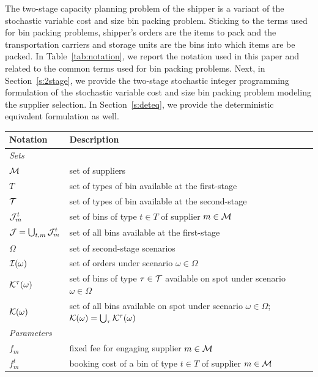 \documentclass[a4paper,11pt]{article}
\begin{document}
	The two-stage capacity planning problem of the shipper is a variant of the stochastic variable cost and size bin packing problem.
	Sticking to the terms used for bin packing problems, shipper's orders are the items to pack and the transportation carriers and storage units are the bins into which items are be packed.
	In Table~\ref{tab:notation}, we report the notation used in this paper and related to the common terms used for bin packing problems.
	Next, in Section~\ref{s:2stage}, we provide the two-stage stochastic integer programming formulation of the stochastic variable cost and size bin packing problem modeling the supplier selection.
	In Section~\ref{s:deteq}, we provide the deterministic equivalent formulation as well.
	\begin{table}[!ht]
		\centering
		\begin{tabular}{p{2.5cm}p{10.5cm}}
			\hline
			{\textbf{Notation}}  &\textbf{Description}\\
			\hline
			\textit{Sets}&\\
			\hline
			$\cal M$ & set of suppliers \\%
			$T$ & set of types of bin available at the first-stage \\%
			$\cal T$ & set of types of bin available at the second-stage \\
			${\cal J}^{t}_{m}$ & set of bins of type $t \in T$ of supplier $m \in {\cal M}$ \\
			${\cal J}=\bigcup_{t,m} {\cal J}^{t}_{m}$ & set of all bins available at the first-stage \\
			$\Omega$ & set of second-stage scenarios \\ 
			${\cal I}(\omega)$ & set of orders under scenario $ \omega \in \Omega$ \\
			${\cal K}^{\tau}(\omega)$ & set of bins of type $\tau \in \cal T$ available on spot under scenario $ \omega \in \Omega$ \\ %
			${\cal K}(\omega)$ & set of all bins available on spot under scenario $ \omega \in \Omega$; ${\cal K}(\omega)= \bigcup_{\tau}{\cal K}^{\tau}(\omega)$ \\
			\hline	\textit{Parameters}&\\\hline
			$f_{m}$ & fixed fee for engaging supplier $m \in \cal{M}$ \\
			$f^t_m$ & booking cost of a bin of type $t \in T$ of supplier $m \in \cal{M}$ \\

\end{tabular}
\end{table}
\end{document}
